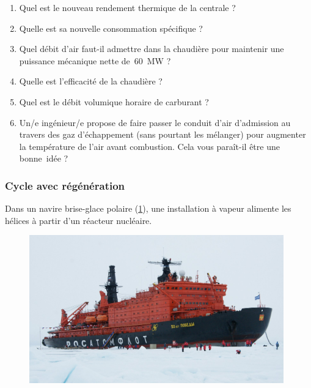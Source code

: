 	\begin{enumerate}
		\item Quel est le nouveau rendement thermique de la centrale ?
		\item Quelle est sa nouvelle consommation spécifique ?
		\item Quel débit d’air faut-il admettre dans la chaudière pour maintenir une puissance mécanique nette de~\SI{60}{\mega\watt} ?
		\item Quelle est l’efficacité de la chaudière ?
		\item Quel est le débit volumique horaire de carburant ?
		\item Un/e ingénieur/e propose de faire passer le conduit d’air d’admission au travers des gaz d’échappement (sans pourtant les mélanger) pour augmenter la température de l’air avant combustion. Cela vous paraît-il être une bonne~idée ?
	\end{enumerate}
	
\onlyframabook{\clearpage}
\subsubsection{Cycle avec régénération}
\label{exo_brise_glace}

	Dans un navire brise-glace polaire (\cref{fig_50letpodeby}), une installation à vapeur alimente les hélices à partir d’un réacteur nucléaire.

	\begin{figure}
		\begin{center}
			\includegraphics[width=11cm]{images/50letpodeby.jpg}
		\end{center}
		\label{fig_50letpodeby}
	\end{figure}


